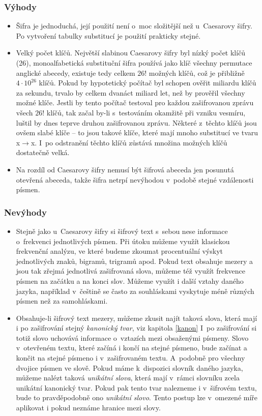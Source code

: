 \documentclass[12pt]{article}
\theoremstyle{definition}
\begin{document}
\subsubsection{Výhody}

\begin{itemize}
\item Šifra je jednoduchá, její použití není o~moc složitější než u~Caesarovy šifry. Po vytvoření tabulky substitucí je použití prakticky stejné.
\item Velký počet klíčů. Největší slabinou Caesarovy šifry byl nízký počet klíčů (26), monoalfabetická substituční šifra používá jako klíč všechny permutace anglické abecedy, existuje tedy celkem $26!$ možných klíčů, což je přibližně $4\cdot10^{26}$ klíčů. Pokud by hypotetický počítač byl schopen ověřit miliardu klíčů za sekundu, trvalo by celkem dvanáct miliard let, než by prověřil všechny možné klíče. Jestli by tento počítač testoval pro každou zašifrovanou zprávu všech $26!$ klíčů, tak začal by-li s~testováním okamžitě při vzniku vesmíru, luštil by dnes teprve druhou zašifrovanou zprávu. Některé z~těchto klíčů jsou ovšem slabé klíče -- to jsou takové klíče, které mají mnoho substitucí ve tvaru x$\rightarrow$x. I~po odstranění těchto klíčů zůstává množina možných klíčů dostatečně velká. 
\item Na rozdíl od Caesarovy šifry nemusí být šifrová abeceda jen posunutá otevřená abeceda, takže šifra netrpí nevýhodou v~podobě stejné vzdálenosti písmen. 
\end{itemize}

\newpage
\subsubsection{Nevýhody}

\begin{itemize}
\item Stejně jako u~Caesarovy šifry si šifrový text s~sebou nese informace o~frekvenci jednotlivých písmen. Při útoku můžeme využít klasickou frekvenční analýzu, ve které budeme zkoumat procentuální výskyt jednotlivých znaků, bigramů, trigramů apod. Pokud text obsahuje mezery a jsou tak zřejmá jednotlivá zašifrovaná slova, můžeme též využít frekvence písmen na začátku a na konci slov. Můžeme využít i další vztahy daného jazyka, například v~češtině se často za souhláskami vyskytuje méně různých písmen než za samohláskami. 
\item Obsahuje-li šifrový text mezery, můžeme zkusit najít taková slova, která mají i po zašifrování stejný {\em kanonický tvar}, viz kapitola \ref{kanon} I~po zašifrování si totiž slovo uchovává informace o~vztazích mezi obsaženými písmeny. Slovo v~otevřeném textu, které začíná i končí na stejné písmeno, bude začínat a končit na stejné písmeno i v~zašifrovaném textu. A~podobně pro všechny dvojice písmen ve slově. Pokud máme k~dispozici slovník daného jazyka, můžeme nalézt taková {\em unikátní slova}, která mají v~rámci slovníku zcela unikátní kanonický tvar. Pokud pak tento tvar nalezneme i v~šifrovém textu, bude to pravděpodobně ono {\em unikátní slovo}. Tento postup lze v~omezené míře aplikovat i pokud neznáme hranice mezi slovy. 
\end{itemize}
\end{document}
